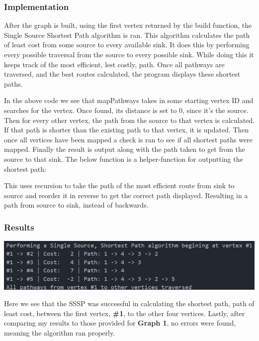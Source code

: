 \documentclass[12pt, letterpaper]{article}
\begin{document}
\subsubsection{Implementation}
After the graph is built, using the first vertex returned by the build function, the Single Source Shortest Path algorithm is ran.
This algorithm calculates the path of least cost from some source to every available sink.
It does this by performing every possible traversal from the source to every possible sink.
While doing this it keeps track of the most efficient, lest costly, path.
Once all pathways are traversed, and the best routes calculated, the program displays these shortest paths.
\begin{center}
   
\end{center}
In the above code we see that mapPathways takes in some starting vertex ID and searches for the vertex.
Once found, its distance is set to 0, since it's the source.
Then for every other vertex, the path from the source to that vertex is calculated.
If that path is shorter than the existing path to that vertex, it is updated.
Then once all vertices have been mapped a check is ran to see if all shortest paths were mapped.
Finally the result is output along with the path taken to get from the source to that sink.
\vspace*{5px}
\newline
The below function is a helper-function for outputting the shortest path:
\begin{center}
   
\end{center}
This uses recursion to take the path of the most efficient route from sink to source and reorder it in reverse to get the correct path displayed.
Resulting in a path from source to sink, instead of backwards.

\subsubsection{Results}
\begin{center}
   \includegraphics{results/Graph1_SSSP.png}
\end{center}
Here we see that the SSSP was successful in calculating the shortest path, path of least cost, between the first vertex, \textbf{\#1}, to the other four vertices.
Lastly, after comparing my results to those provided for \textbf{Graph 1}, no errors were found, meaning the algorithm ran properly.
\end{document}
